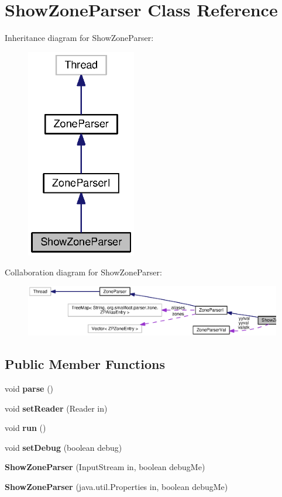 \section{Show\+Zone\+Parser Class Reference}
\label{classorg_1_1smallfoot_1_1parser_1_1zone_1_1ShowZoneParser}


Inheritance diagram for Show\+Zone\+Parser\+:\nopagebreak
\begin{figure}[H]
\begin{center}
\leavevmode
\includegraphics[width=136pt]{classorg_1_1smallfoot_1_1parser_1_1zone_1_1ShowZoneParser__inherit__graph}
\end{center}
\end{figure}


Collaboration diagram for Show\+Zone\+Parser\+:\nopagebreak
\begin{figure}[H]
\begin{center}
\leavevmode
\includegraphics[width=350pt]{classorg_1_1smallfoot_1_1parser_1_1zone_1_1ShowZoneParser__coll__graph}
\end{center}
\end{figure}
\subsection*{Public Member Functions}
\begin{DoxyCompactItemize}
\item 
void {\bf parse} ()
\item 
void {\bf set\+Reader} (Reader in)
\item 
void {\bf run} ()
\item 
void {\bf set\+Debug} (boolean debug)
\item 
{\bf Show\+Zone\+Parser} (Input\+Stream in, boolean debug\+Me)
\item 
{\bf Show\+Zone\+Parser} (java.\+util.\+Properties in, boolean debug\+Me)
\end{DoxyCompactItemize}
